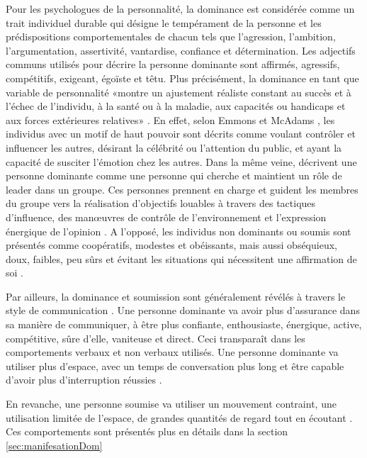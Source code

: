 Pour les psychologues de la personnalité, la dominance est considérée comme un trait individuel durable qui désigne le tempérament de la personne et les prédispositions comportementales de chacun \cite{cattell1970handbook,ridgeway1987nonverbal} tels que l'agression, l'ambition, l'argumentation,
assertivité, vantardise, confiance et détermination.
Les adjectifs communs utilisés pour décrire la personne dominante sont affirmés, agressifs, compétitifs, exigeant, égoïste et têtu. Plus précisément, la dominance en tant que variable de personnalité «montre un ajustement réaliste constant au succès et à l'échec de l'individu, à la santé ou à la maladie, aux capacités ou handicaps et aux forces extérieures relatives» \cite{cattell1970handbook,burgoon1998nature}.
En effet, selon  Emmons et McAdams \cite{emmons1991personal}, les individus avec un motif de haut pouvoir sont décrits comme voulant contrôler et influencer les autres, désirant la célébrité ou l'attention du public, et ayant la capacité de susciter l'émotion chez les autres. Dans la même veine, \cite{jackson1974personality} décrivent une personne dominante comme une personne qui cherche et maintient un rôle de leader dans un groupe. Ces personnes prennent en charge et guident les membres du groupe vers la réalisation d'objectifs louables à travers des tactiques d'influence, des manœuvres de contrôle de l'environnement et l'expression énergique de l'opinion \cite{burgoon1998nature}. 
A l'opposé, les individus non dominants ou soumis sont présentés comme coopératifs, modestes et obéissants, mais aussi obséquieux, doux, faibles, peu sûrs et évitant les situations qui nécessitent une affirmation de soi \cite{burgoon1998nature}. 

Par ailleurs, la dominance et soumission sont généralement révélés à travers le style de communication \cite{burgoon1998nature}. Une personne dominante va avoir plus d'assurance dans sa manière de communiquer, à être plus confiante, enthousiaste, énergique, active, compétitive, sûre d'elle, vaniteuse et direct. Ceci transparaît dans les comportements verbaux et non verbaux utilisés. Une personne dominante va  utiliser plus d'espace, avec un temps de conversation plus long et être capable d'avoir plus d'interruption réussies \cite{burgoon1998nature}. 

En revanche, une personne soumise va utiliser un mouvement contraint, une utilisation limitée de l'espace, de grandes quantités de regard tout en écoutant  \cite{burgoon1998nature}. Ces comportements sont présentés plus en détails dans la section  \ref{sec:manifesationDom}


